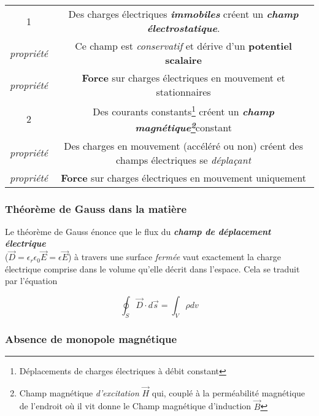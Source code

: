 \documentclass[a4paper,12pt]{article}
\begin{document}
\begin{center}

\begin{tabular}{|c|c|}

\hline

1 & Des charges électriques \textit{\textbf{immobiles}} créent un \textit{\textbf{champ électrostatique}}. \\
\textit{propriété} & Ce champ est \textit{conservatif} et dérive d'un \textbf{potentiel scalaire} \\ 
\textit{propriété} & \textbf{Force} sur charges électriques en mouvement et stationnaires \\

\hline

2 & Des courants constants\footnote{Déplacements de charges électriques à débit constant} créent un \textit{\textbf{champ magnétique\footnote{Champ magnétique \textit{d'excitation} $\vec{H}$ qui, couplé à la perméabilité magnétique de l'endroit où il vit donne le Champ magnétique d'induction $\vec{B}$}}}constant\\
\textit{propriété} & Des charges en mouvement (accéléré ou non) créent des champs électriques se \textit{déplaçant} \\
\textit{propriété} & \textbf{Force} sur charges électriques en mouvement uniquement \\

\hline


\end{tabular}

\end{center}

\subsubsection{Théorème de Gauss dans la matière}

Le théorème de Gauss énonce que le flux du \textit{\textbf{champ de déplacement électrique}} \\($\vec{D} = \epsilon_{r}\epsilon_{0}\vec{E} = \epsilon \vec{E}$)
à travers une surface \textit{fermée} vaut exactement la charge électrique comprise dans le volume qu'elle décrit dans l'espace. Cela se traduit par l'équation 

\begin{equation}
 \oint_{S} \vec{D} \cdot d\vec{s} = \int_{V} \rho dv
 \label{GaussIntegral}
\end{equation}

\subsubsection{Absence de monopole magnétique}
\end{document}

